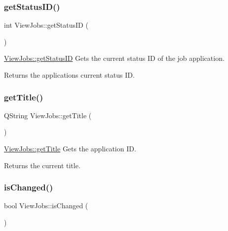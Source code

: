 \subsubsection{\texorpdfstring{get\+Status\+I\+D()}{getStatusID()}}
{\footnotesize\ttfamily int View\+Jobs\+::get\+Status\+ID (\begin{DoxyParamCaption}{ }\end{DoxyParamCaption})}



\hyperlink{class_view_jobs_a91696fde9f0a663bae929390aac8324b}{View\+Jobs\+::get\+Status\+ID} Gets the current status ID of the job application. 

\begin{DoxyReturn}{Returns}
the application\textquotesingle{}s current status ID. 
\end{DoxyReturn}
\mbox{\label{class_view_jobs_ae78f119d37c77a9e3e457ecfd78d7de3}} 
\subsubsection{\texorpdfstring{get\+Title()}{getTitle()}}
{\footnotesize\ttfamily Q\+String View\+Jobs\+::get\+Title (\begin{DoxyParamCaption}{ }\end{DoxyParamCaption})}



\hyperlink{class_view_jobs_ae78f119d37c77a9e3e457ecfd78d7de3}{View\+Jobs\+::get\+Title} Gets the application ID. 

\begin{DoxyReturn}{Returns}
the current title. 
\end{DoxyReturn}
\mbox{\label{class_view_jobs_a5f75b45d28ce7f4a8050ce9ce0f44350}} 
\subsubsection{\texorpdfstring{is\+Changed()}{isChanged()}}
{\footnotesize\ttfamily bool View\+Jobs\+::is\+Changed (\begin{DoxyParamCaption}{ }\end{DoxyParamCaption})}



